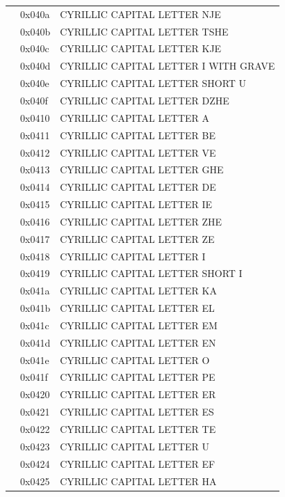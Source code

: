 \documentclass[12pt, twoside]{article}
\begin{document}
\begin{longtable}{L{1.0cm} L{2.0cm} >{\footnotesize}L{10cm}}
&0x040a&CYRILLIC CAPITAL LETTER NJE\\
&0x040b&CYRILLIC CAPITAL LETTER TSHE\\
&0x040c&CYRILLIC CAPITAL LETTER KJE\\
&0x040d&CYRILLIC CAPITAL LETTER I WITH GRAVE\\
&0x040e&CYRILLIC CAPITAL LETTER SHORT U\\
&0x040f&CYRILLIC CAPITAL LETTER DZHE\\
&0x0410&CYRILLIC CAPITAL LETTER A\\
&0x0411&CYRILLIC CAPITAL LETTER BE\\
&0x0412&CYRILLIC CAPITAL LETTER VE\\
&0x0413&CYRILLIC CAPITAL LETTER GHE\\
&0x0414&CYRILLIC CAPITAL LETTER DE\\
&0x0415&CYRILLIC CAPITAL LETTER IE\\
&0x0416&CYRILLIC CAPITAL LETTER ZHE\\
&0x0417&CYRILLIC CAPITAL LETTER ZE\\
&0x0418&CYRILLIC CAPITAL LETTER I\\
&0x0419&CYRILLIC CAPITAL LETTER SHORT I\\
&0x041a&CYRILLIC CAPITAL LETTER KA\\
&0x041b&CYRILLIC CAPITAL LETTER EL\\
&0x041c&CYRILLIC CAPITAL LETTER EM\\
&0x041d&CYRILLIC CAPITAL LETTER EN\\
&0x041e&CYRILLIC CAPITAL LETTER O\\
&0x041f&CYRILLIC CAPITAL LETTER PE\\
&0x0420&CYRILLIC CAPITAL LETTER ER\\
&0x0421&CYRILLIC CAPITAL LETTER ES\\
&0x0422&CYRILLIC CAPITAL LETTER TE\\
&0x0423&CYRILLIC CAPITAL LETTER U\\
&0x0424&CYRILLIC CAPITAL LETTER EF\\
&0x0425&CYRILLIC CAPITAL LETTER HA\\

\end{longtable}
\end{document}
